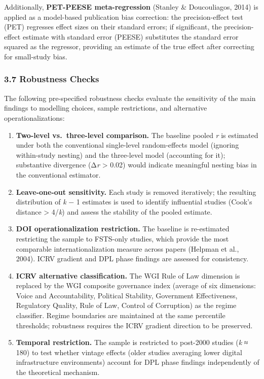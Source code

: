 \documentclass[
  12pt,a4paper]{article}
\providecommand{\tightlist}{%
  \setlength{\itemsep}{0pt}\setlength{\parskip}{0pt}}
\begin{document}
Additionally, \textbf{PET-PEESE meta-regression} (Stanley \&
Doucouliagos, 2014) is applied as a model-based publication bias
correction: the precision-effect test (PET) regresses effect sizes on
their standard errors; if significant, the precision-effect estimate
with standard error (PEESE) substitutes the standard error squared as
the regressor, providing an estimate of the true effect after correcting
for small-study bias.

\hypertarget{robustness-checks}{%
\subsubsection{3.7 Robustness Checks}\label{robustness-checks}}

The following pre-specified robustness checks evaluate the sensitivity
of the main findings to modelling choices, sample restrictions, and
alternative operationalizations:

\begin{enumerate}
\def\labelenumi{\arabic{enumi}.}
\tightlist
\item
  \textbf{Two-level vs.~three-level comparison.} The baseline pooled
  \emph{r} is estimated under both the conventional single-level
  random-effects model (ignoring within-study nesting) and the
  three-level model (accounting for it); substantive divergence
  (Δ\emph{r} \textgreater{} 0.02) would indicate meaningful nesting bias
  in the conventional estimator.
\item
  \textbf{Leave-one-out sensitivity.} Each study is removed iteratively;
  the resulting distribution of \emph{k} − 1 estimates is used to
  identify influential studies (Cook's distance \textgreater{}
  4/\emph{k}) and assess the stability of the pooled estimate.
\item
  \textbf{DOI operationalization restriction.} The baseline is
  re-estimated restricting the sample to FSTS-only studies, which
  provide the most comparable internationalization measure across papers
  (Helpman et al., 2004). ICRV gradient and DPL phase findings are
  assessed for consistency.
\item
  \textbf{ICRV alternative classification.} The WGI Rule of Law
  dimension is replaced by the WGI composite governance index (average
  of six dimensions: Voice and Accountability, Political Stability,
  Government Effectiveness, Regulatory Quality, Rule of Law, Control of
  Corruption) as the regime classifier. Regime boundaries are maintained
  at the same percentile thresholds; robustness requires the ICRV
  gradient direction to be preserved.
\item
  \textbf{Temporal restriction.} The sample is restricted to post-2000
  studies (\emph{k} ≈ 180) to test whether vintage effects (older
  studies averaging lower digital infrastructure environments) account
  for DPL phase findings independently of the theoretical mechanism.
\end{enumerate}
\end{document}
